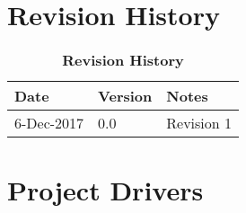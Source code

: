 \documentclass[12pt, titlepage]{article}
\newcommand{\revisionTable}{
	\begin{table}[hp]
		
		\begin{tabularx}{\textwidth}{p{3cm}p{2cm}X}
			\toprule {\bf Date} & {\bf Version} & {\bf Notes}\\
			\midrule
			
			6-Dec-2017 & 0.0 & Revision 1\\
			
			\bottomrule
		\end{tabularx}
	\caption{\bf Revision History}
	\end{table}
}
\begin{document}
	
	
	
	
	
	
	\def\thesection{\arabic{section}} 
	\renewcommand\thesection{\arabic{section}} 
	\renewcommand\thesubsection{\thesection.\arabic{subsection}}
	
	\tableofcontents
	
	\listoftables
	
	
	
	\newpage
	
	\section{Revision History}
	\revisionTable

	
	\section{Project Drivers}
\newcommand{\labelWidth}{55pt}
\newcommand{\descWidth}{5.13in}

	\newcommand{\pbox}[1]{\parbox[t]{\descWidth}{#1}}

	\newcommand{\labelbox}[1]{\parbox[t]{\labelWidth}{\textit{#1}}}
	\newcommand{\myline}{%
		\kern1pt %
		\hrule height 0.8pt
		\kern3pt %
	}


\newcommand\Tstrut{\rule{0pt}{0.5ex}}         %
\newcommand\Bstrut{\rule[-0.9ex]{0pt}{0pt}}   %
\end{document}
